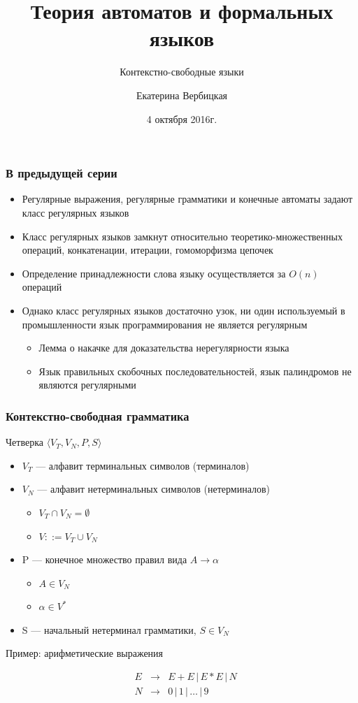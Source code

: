 \documentclass{beamer}
\title[]{Теория автоматов и формальных языков}
\subtitle[]{Контекстно-свободные языки}
\institute[]{
Санкт-Петербургский государственный электротехнический университет <<ЛЭТИ>>\\
}
\author[]{Екатерина Вербицкая}
\date{4 октября 2016г.}
\begin{document}
{
  \begin{frame}
    \titlepage
  \end{frame}
}


\begin{frame}[fragile]
  \transwipe[direction=90]
  \frametitle{В предыдущей серии}
  \begin{itemize}
    \item Регулярные выражения, регулярные грамматики и конечные автоматы задают класс регулярных языков
    \item Класс регулярных языков замкнут относительно теоретико-множественных операций, конкатенации, итерации, гомоморфизма цепочек
    \item Определение принадлежности слова языку осуществляется за $O(n)$ операций
    \item Однако класс регулярных языков достаточно узок, ни один используемый в промышленности язык программирования не является регулярным
    \begin{itemize}
      \item Лемма о накачке для доказательства нерегулярности языка
      \item Язык правильных скобочных последовательностей, язык палиндромов не являются регулярными
    \end{itemize}
  \end{itemize}
\end{frame}

\begin{frame}[fragile]
  \transwipe[direction=90]
  \frametitle{Контекстно-свободная грамматика}
  Четверка $\langle V_T, V_N, P, S \rangle$

   \begin{itemize}
     \item $V_T$ --- алфавит терминальных символов (терминалов) 
     \item $V_N$ --- алфавит нетерминальных символов (нетерминалов)
     \begin{itemize} 
        \item $V_T \cap V_N = \emptyset$ 
        \item $V ::= V_T \cup V_N$
     \end{itemize}
     \item P --- конечное множество правил вида $A \rightarrow \alpha$
     \begin{itemize}
       \item $A \in V_N $
       \item $\alpha \in V^*$
     \end{itemize}  
     \item S --- начальный нетерминал грамматики, $S  \in V_N$
  \end{itemize}

Пример: арифметические выражения

  $$
  \begin{array}{crcl}
  &E& \rightarrow & E + E \, | \, E * E \, | \, N \\
  &N& \rightarrow & 0 \, | \, 1  \, | \, \dots \, | \, 9
  \end{array}
  $$
\end{frame}
\end{document}
